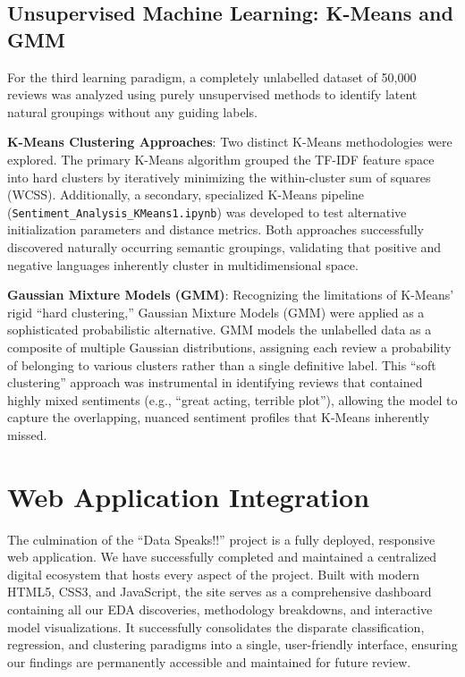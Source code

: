 \documentclass[conference]{IEEEtran}
\begin{document}
\subsection{Unsupervised Machine Learning: K-Means and GMM}
For the third learning paradigm, a completely unlabelled dataset of 50,000 reviews was analyzed using purely unsupervised methods to identify latent natural groupings without any guiding labels.

\textbf{K-Means Clustering Approaches}: Two distinct K-Means methodologies were explored. The primary K-Means algorithm grouped the TF-IDF feature space into hard clusters by iteratively minimizing the within-cluster sum of squares (WCSS). Additionally, a secondary, specialized K-Means pipeline (\texttt{Sentiment\_Analysis\_KMeans1.ipynb}) was developed to test alternative initialization parameters and distance metrics. Both approaches successfully discovered naturally occurring semantic groupings, validating that positive and negative languages inherently cluster in multidimensional space.

\textbf{Gaussian Mixture Models (GMM)}: Recognizing the limitations of K-Means' rigid ``hard clustering,'' Gaussian Mixture Models (GMM) were applied as a sophisticated probabilistic alternative. GMM models the unlabelled data as a composite of multiple Gaussian distributions, assigning each review a probability of belonging to various clusters rather than a single definitive label. This ``soft clustering'' approach was instrumental in identifying reviews that contained highly mixed sentiments (e.g., ``great acting, terrible plot''), allowing the model to capture the overlapping, nuanced sentiment profiles that K-Means inherently missed.

\section{Web Application Integration}
The culmination of the ``Data Speaks!!'' project is a fully deployed, responsive web application. We have successfully completed and maintained a centralized digital ecosystem that hosts every aspect of the project. Built with modern HTML5, CSS3, and JavaScript, the site serves as a comprehensive dashboard containing all our EDA discoveries, methodology breakdowns, and interactive model visualizations. It successfully consolidates the disparate classification, regression, and clustering paradigms into a single, user-friendly interface, ensuring our findings are permanently accessible and maintained for future review.
\end{document}
